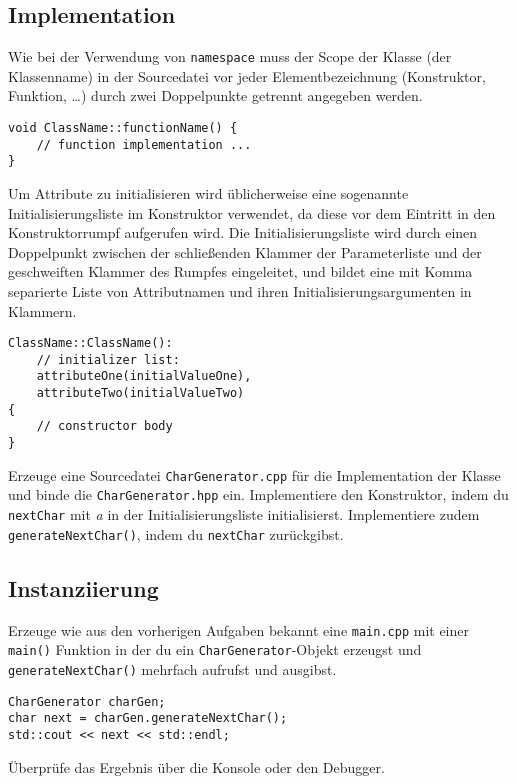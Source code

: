 \subsection{Implementation}
Wie bei der Verwendung von \texttt{namespace} muss der Scope der Klasse (der Klassenname) in der Sourcedatei vor jeder Elementbezeichnung (Konstruktor, Funktion, \dots) durch zwei Doppelpunkte getrennt angegeben werden.

\begin{lstlisting}
void ClassName::functionName() {
	// function implementation ...
}
\end{lstlisting}

Um Attribute zu initialisieren wird üblicherweise eine sogenannte Initialisierungsliste im Konstruktor verwendet, da diese vor dem Eintritt in den Konstruktorrumpf aufgerufen wird.
Die Initialisierungsliste wird durch einen Doppelpunkt zwischen der schließenden Klammer der Parameterliste und der geschweiften Klammer des Rumpfes eingeleitet, und bildet eine mit Komma separierte Liste von Attributnamen und ihren Initialisierungsargumenten in Klammern.

\begin{lstlisting}
ClassName::ClassName():
	// initializer list:
	attributeOne(initialValueOne),
	attributeTwo(initialValueTwo)
{
	// constructor body
}
\end{lstlisting}

Erzeuge eine Sourcedatei \texttt{CharGenerator.cpp} für die Implementation der Klasse und binde die \texttt{CharGenerator.hpp} ein.
Implementiere den Konstruktor, indem du \texttt{nextChar} mit \emph{a} in der Initialisierungsliste initialisierst.
Implementiere zudem \texttt{generateNextChar()}, indem du \texttt{nextChar} zurückgibst.


\subsection{Instanziierung}
Erzeuge wie aus den vorherigen Aufgaben bekannt eine \texttt{main.cpp} mit einer \texttt{main()} Funktion in der du ein \texttt{CharGenerator}-Objekt erzeugst und \texttt{generateNextChar()} mehrfach aufrufst und ausgibst.
\begin{lstlisting}
CharGenerator charGen;
char next = charGen.generateNextChar();
std::cout << next << std::endl;
\end{lstlisting}
Überprüfe das Ergebnis über die Konsole oder den Debugger.


